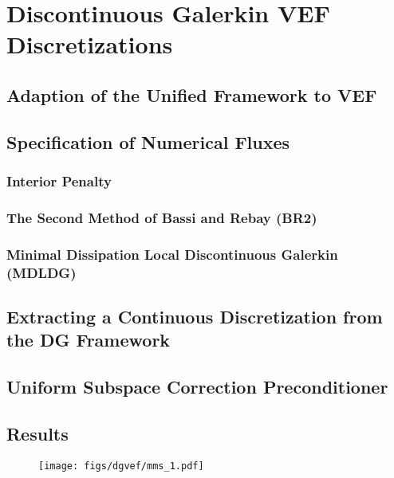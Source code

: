 \documentclass[../doc.tex]{subfiles}
\begin{document}
\chapter{Discontinuous Galerkin VEF Discretizations}

\section{Adaption of the Unified Framework to VEF}

\section{Specification of Numerical Fluxes}
\subsection{Interior Penalty}
\subsection{The Second Method of Bassi and Rebay (BR2)}
\subsection{Minimal Dissipation Local Discontinuous Galerkin (MDLDG)}

\section{Extracting a Continuous Discretization from the DG Framework}

\section{Uniform Subspace Correction Preconditioner}

\section{Results}
\begin{table}
\centering
\caption{}
\label{}

\end{table}

\begin{table}
\centering
\caption{}
\label{}

\end{table}

\begin{figure}
\centering
\texttt{[image: figs/dgvef/mms\_1.pdf]}
\caption{}
\label{}
\end{figure}
\end{document}
